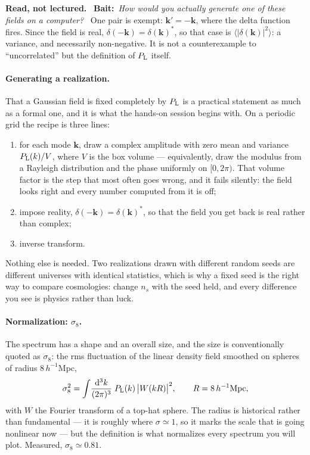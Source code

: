 \documentclass[a4paper,11pt]{article}
\newcommand{\vk}{\bm{k}}
\def\Plin{P_{\rm L}}
\newcommand{\dd}{\mathrm{d}}
\numberwithin{equation}{section}
\newenvironment{reading}
  {\par\medskip\noindent\begingroup\small\color{black!58}%
   \textbf{Read, not lectured.}\ }
  {\endgroup\par\medskip}
\newcommand{\bait}[1]{\textbf{Bait:}\ \emph{#1}\ }
\begin{document}
\begin{reading}
\bait{How would you actually generate one of these fields on a computer?}
One pair is exempt: $\vk' = -\vk$, where the delta function fires. Since the field is real, $\delta(-\vk) = \delta(\vk)^*$, so that case is $\langle|\delta(\vk)|^2\rangle$: a variance, and necessarily non-negative. It is not a counterexample to ``uncorrelated'' but the definition of $\Plin$ itself.

\paragraph{Generating a realization.} That a Gaussian field is fixed completely by $\Plin$ is a
practical statement as much as a formal one, and it is what the hands-on session
begins with. On a periodic grid the recipe is three lines:
\begin{enumerate}[itemsep=1pt,topsep=2pt]
\item for each mode $\vk$, draw a complex amplitude with zero mean and variance
$\Plin(k)/V$, where $V$ is the box volume --- equivalently, draw the modulus
from a Rayleigh distribution and the phase uniformly on $[0,2\pi)$. That volume
factor is the step that most often goes wrong, and it fails silently: the field
looks right and every number computed from it is off;
\item impose reality, $\delta(-\vk) = \delta(\vk)^*$, so that the field you get
back is real rather than complex;
\item inverse transform.
\end{enumerate}
Nothing else is needed. Two realizations drawn with different random seeds are
different universes with identical statistics, which is why a fixed seed is the
right way to compare cosmologies: change $n_s$ with the seed held, and every
difference you see is physics rather than luck.

\paragraph{Normalization: $\sigma_8$.} The spectrum has a shape and an
overall size, and the size is conventionally quoted as $\sigma_8$: the rms
fluctuation of the linear density field smoothed on spheres of radius
$8\,h^{-1}$Mpc,
\begin{equation}
\sigma_8^2 = \int\!\frac{\dd^3k}{(2\pi)^3}\;\Plin(k)\,\big|W(kR)\big|^2 ,
\qquad R = 8\,h^{-1}{\rm Mpc},
\label{eq:sigma8}
\end{equation}
with $W$ the Fourier transform of a top-hat sphere. The radius is historical
rather than fundamental --- it is roughly where $\sigma \simeq 1$, so it marks
the scale that is going nonlinear now --- but the definition is what normalizes
every spectrum you will plot. Measured, $\sigma_8 \simeq 0.81$.
\end{reading}
\end{document}

